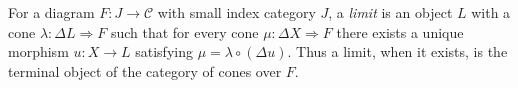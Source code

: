 
For a diagram $F:J\to\mathcal C$ with small index category $J$, a \emph{limit} is an object $L$ with a cone $\lambda:\Delta L\Rightarrow F$ such that for every cone $\mu:\Delta X\Rightarrow F$ there exists a unique morphism $u:X\to L$ satisfying $\mu=\lambda\circ(\Delta u)$. Thus a limit, when it exists, is the terminal object of the category of cones over $F$.
